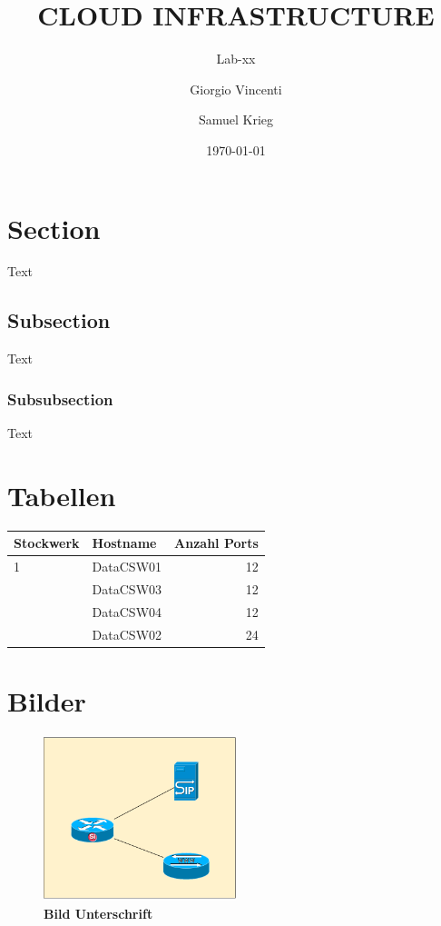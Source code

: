 \documentclass[a4,12pt]{scrartcl}
\title{CLOUD INFRASTRUCTURE}
\subtitle{Lab-xx}
\author{Giorgio Vincenti \and Samuel Krieg}
\date{\today}
\begin{document}
\clearpage\maketitle
\thispagestyle{empty}
\tableofcontents
\newpage

\section{Section}
Text

\subsection{Subsection}
Text


\subsubsection{Subsubsection}
Text

\section{Tabellen}
\begin{center}
    \begin{tabular}{@{} l l r@{}}\toprule    
    {Stockwerk} & {Hostname} & {Anzahl Ports}\\ \midrule
    1 & DataCSW01 & 12\\ \addlinespace
    & DataCSW03 & 12\\ \addlinespace
    & DataCSW04 & 12\\ \addlinespace
    2& DataCSW02 & 24\\
    \bottomrule
    \end{tabular}
\end{center}

\section{Bilder}
\begin{figure} [H]
	\begin{center}
	\includegraphics[width=0.50\textwidth]{./pictures/sample_picture.pdf}
	\caption{\textbf{Bild Unterschrift}}
	\label{Bild Referenz}
	\end{center}
\end{figure}
\end{document}
